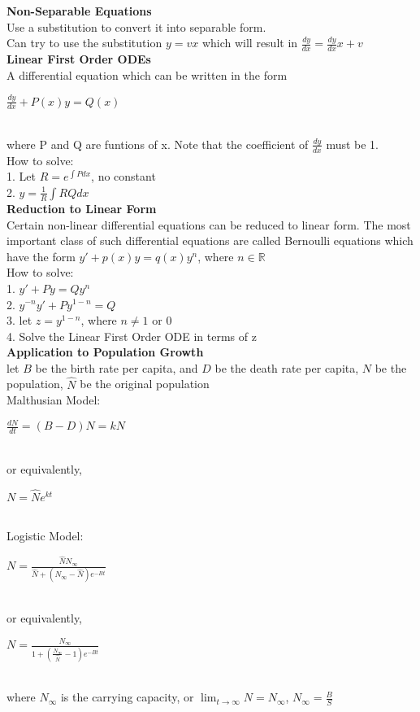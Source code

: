 \documentclass[10pt, a4paper]{article}
\begin{document}
\begin{multicols*}{3}
    \textbf{Non-Separable Equations}\\
    Use a substitution to convert it into separable form.\\
    Can try to use the substitution $y = vx$ which will result in $\frac{dy}{dx} = \frac{dy}{dx}x + v$\\
    
    \textbf{Linear First Order ODEs}\\
    A differential equation which can be written in the form \\
    \centerline{$\frac{dy}{dx} + P(x)y = Q(x)$}\\
    where P and Q are funtions of x. Note that the coefficient of $\frac{dy}{dx}$ must be 1.\\
    
    How to solve:\\
    1. Let $R = e^{\int P dx}$, no constant\\
    2. $y = \frac{1}{R} \int RQdx$\\
    
    \textbf{Reduction to Linear Form}\\
    Certain non-linear differential equations can be reduced to linear form. The most important class of such differential equations are called Bernoulli equations which have the form $y' + p(x)y = q(x)y^n$, where $n \in \mathbb{R}$\\
    
    How to solve:\\
    1. $y' + Py = Qy^n$\\
    2. $y^{-n}y' + Py^{1-n} = Q$\\
    3. let $z = y^{1 - n}$, where $n \neq 1$ or $0$\\
    4. Solve the Linear First Order ODE in terms of z\\
    
    \textbf{Application to Population Growth}\\
    let $B$ be the birth rate per capita, and $D$ be the death rate per capita, $N$ be the population, $\hat{N}$ be the original population\\
    
    Malthusian Model:\\
    \centerline{$\frac{dN}{dt} = (B - D)N = kN$}\\
    or equivalently,\\
    \centerline{$N = \hat{N}e^{kt}$}\\
    
    Logistic Model:\\
    {\large\centerline{$N = \frac{\hat{N}N_\infty}{\hat{N} + (N_\infty - \hat{N})e^{-Bt}}$}}\\
    or equivalently, \\
    {\large\centerline{$N = \frac{N_\infty}{1 + (\frac{N_\infty}{\hat{N}} - 1)e^{-Bt}}$}}\\
    where $N_\infty$ is the carrying capacity, or $\lim_{t \to \infty} N = N_\infty$, $N_\infty = \frac{B}{S}$
   
	
	\end{multicols*}
\end{document}
